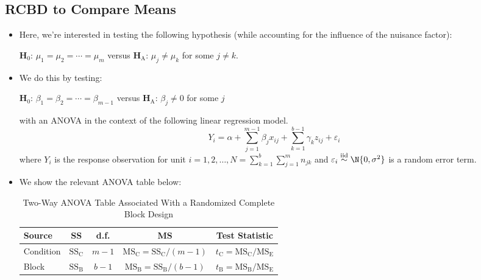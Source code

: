 \subsection{RCBD to Compare Means}
\begin{itemize}
      \item Here, we're interested in testing the following hypothesis (while accounting for the influence of the
            nuisance factor):
            \begin{tightcenter}
                  $ \mathbf{H}_0 $: $ \mu_1=\mu_2=\cdots=\mu_m $ versus $ \mathbf{H}_\text{A} $: $ \mu_j\ne \mu_k $ for some $ j\ne k $.
            \end{tightcenter}
      \item We do this by testing:
            \begin{tightcenter}
                  $ \mathbf{H}_0 $: $ \beta_1=\beta_2=\cdots=\beta_{m-1} $ versus $ \mathbf{H}_\text{A} $: $ \beta_j\ne 0 $ for some $ j $
            \end{tightcenter}
            with an ANOVA in the context of the following linear regression model.
            \[ Y_i=\alpha+\sum_{j=1}^{m-1} \beta_j x_{ij}+\sum_{k=1}^{b-1} \gamma_k z_{ij}+\varepsilon_i \]
            where $ Y_i $ is the response observation for unit $ i=1,2,\ldots,N=\sum_{k=1}^{b} \sum_{j=1}^{m} n_{jk} $
            and $ \varepsilon_i \stackrel{\text{iid}}{\sim}\N{0,\sigma^2} $ is a random error term.
      \item We show the relevant ANOVA table below:
            \begin{table}[!htbp]
                  \centering
                  \caption{Two-Way ANOVA Table Associated With a Randomized Complete Block Design}
                  \begin{NiceTabular}{|l|c|c|c|c|}
                        \toprule
                        Source    & SS                     & d.f.        & MS                                                                   & Test Statistic                                           \\
                        \midrule
                        Condition & $ \text{SS}_\text{C} $ & $ m-1 $     & $ \text{MS}_\text{C}=\text{SS}_\text{C}/(m-1) $     & $ t_\text{C}=\text{MS}_\text{C}/\text{MS}_\text{E} $ \\
                        Block     & $ \text{SS}_\text{B} $ & $ b-1 $     & $ \text{MS}_\text{B}=\text{SS}_\text{B}/(b-1) $     & $ t_\text{B}=\text{MS}_\text{B}/\text{MS}_\text{E} $ \\

\end{NiceTabular}
\end{table}
\end{itemize}
